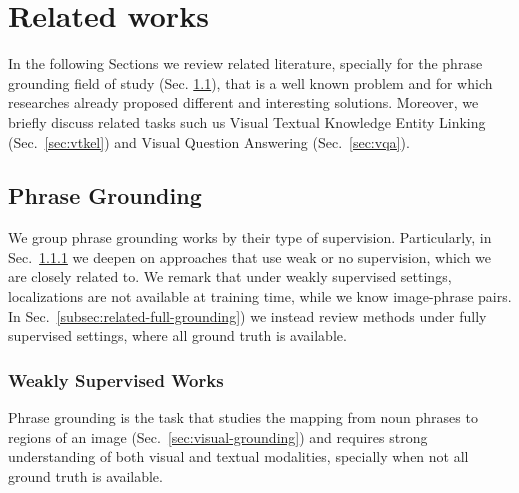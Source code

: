 
\chapter{Related works}
\label{ch:related-works}

In the following Sections we review related literature, specially for
the phrase grounding field of study (Sec.
\ref{sec:related-grounding}), that is a well known problem and for
which researches already proposed different and interesting solutions.
Moreover, we briefly discuss related tasks such us Visual Textual
Knowledge Entity Linking (Sec.~\ref{sec:vtkel}) and Visual Question
Answering (Sec.~\ref{sec:vqa}).

\section{Phrase Grounding}
\label{sec:related-grounding}

We group phrase grounding works by their type of supervision.
Particularly, in Sec.~\ref{subsec:related-weak-grounding} we deepen on
approaches that use weak or no supervision, which we are closely
related to. We remark that under weakly supervised settings,
localizations are not available at training time, while we know
image-phrase pairs. In Sec.~\ref{subsec:related-full-grounding}) we
instead review methods under fully supervised settings, where all
ground truth is available.

\subsection{Weakly Supervised Works}
\label{subsec:related-weak-grounding}

Phrase grounding is the task that studies the mapping from noun
phrases to regions of an image (Sec.~\ref{sec:visual-grounding}) and
requires strong understanding of both visual and textual modalities,
specially when not all ground truth is available. 

